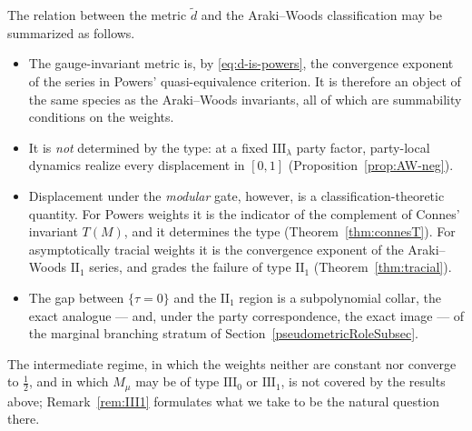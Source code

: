 \documentclass[twoside,11pt,letter]{article}
\theoremstyle{definition}
\theoremstyle{definition}
\theoremstyle{plain}
\begin{document}
The relation between the metric $\tilde d$ and the Araki--Woods classification may be summarized as follows.
\begin{itemize}
\item[(A)] The gauge-invariant metric is, by \eqref{eq:d-is-powers}, the convergence exponent of the series in Powers' quasi-equivalence criterion. It is therefore an object of the same species as the Araki--Woods invariants, all of which are summability conditions on the weights.
\item[(B)] It is \emph{not} determined by the type: at a fixed $\mathrm{III}_\lambda$ party factor, party-local dynamics realize every displacement in $[0,1]$ (Proposition~\ref{prop:AW-neg}).
\item[(C)] Displacement under the \emph{modular} gate, however, is a classification-theoretic quantity. For Powers weights it is the indicator of the complement of Connes' invariant $T(M)$, and it determines the type (Theorem~\ref{thm:connesT}). For asymptotically tracial weights it is the convergence exponent of the Araki--Woods $\mathrm{II}_1$ series, and grades the failure of type $\mathrm{II}_1$ (Theorem~\ref{thm:tracial}).
\item[(D)] The gap between $\{\tau = 0\}$ and the $\mathrm{II}_1$ region is a subpolynomial collar, the exact analogue --- and, under the party correspondence, the exact image --- of the marginal branching stratum of Section~\ref{pseudometricRoleSubsec}.
\end{itemize}
The intermediate regime, in which the weights neither are constant nor converge to $\tfrac12$, and in which $M_\mu$ may be of type $\mathrm{III}_0$ or $\mathrm{III}_1$, is not covered by the results above; Remark~\ref{rem:III1} formulates what we take to be the natural question there.
\end{document}
